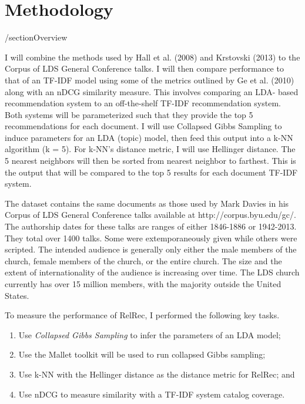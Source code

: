 \chapter{Methodology} \label{chp:chapter2}

/section{Overview}

I will combine the methods used by Hall et al. (2008) and Krstovski (2013) to the Corpus of LDS General Conference talks. I will then compare performance to that of an TF-IDF model using some of the metrics outlined by Ge et al. (2010) along with an nDCG similarity measure. This involves comparing an LDA- based recommendation system to an off-the-shelf TF-IDF recommendation system. Both systems will be parameterized such that they provide the top 5 recommendations for each document. I will use Collapsed Gibbs Sampling to induce parameters for an LDA (topic) model, then feed this output into a k-NN algorithm (k = 5). For k-NN’s distance metric, I will use Hellinger distance. The 5 nearest neighbors will then be sorted from nearest neighbor to farthest. This is the output that will be compared to the top 5 results for each document TF-IDF system.

The dataset contains the same documents as those used by Mark Davies in his Corpus of LDS General Conference talks available at http://corpus.byu.edu/gc/. The authorship dates for these talks are ranges of either 1846-1886 or 1942-2013. They total over 1400 talks. Some were extemporaneously given while others were scripted. The intended audience is generally only either the male members of the church, female members of the church, or the entire church. The size and the extent of internationality of the audience is increasing over time. The LDS church currently has over 15 million members, with the majority outside the United States.

To measure the performance of RelRec, I performed the following key tasks.

\begin{enumerate}
	\item Use \textit{Collapsed Gibbs Sampling} to infer the parameters of an LDA model;
	\item Use the Mallet toolkit will be used to run collapsed Gibbs sampling;
	\item Use k-NN with the Hellinger distance as the distance metric for RelRec; and
	\item Use nDCG to measure similarity with a TF-IDF system catalog coverage.
\end{enumerate}

